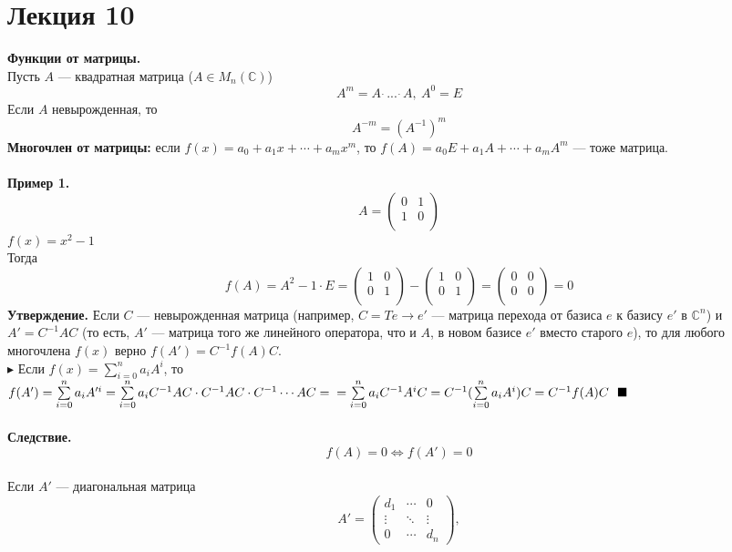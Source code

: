 \documentclass[12pt]{article}
\theoremstyle{definition}
\numberwithin{equation}{section}
\begin{document}
	\section *{Лекция 10}
	\noindent\textbf{Функции от матрицы.}\\
	Пусть $A$ --- квадратная матрица ($A\in M_n(\mathbb{C})$)
	$$A^m=A~ \dot~ ... ~\dot~ A,~A^0=E$$
	Если $A$ невырожденная, то $$A^{-m}=(A^{-1})^m$$
	\textbf{Многочлен от матрицы:} если 
	$f(x)=a_0+a_1x+\cdots+a_mx^m$, то
	$f(A)=a_0E+a_1A+\cdots +a_mA^m$ --- тоже матрица.\\
	\\
	\textbf{Пример 1.}\\
	\[A = \begin{pmatrix}
	0 & 1\\
	1 & 0\\
	\end{pmatrix}\]
	$f(x)=x^2-1$\\
	Тогда 
	\[f(A)=A^2-1\cdot E = \begin{pmatrix}
	1 & 0\\
	0 & 1\\
	\end{pmatrix} - \begin{pmatrix}
	1 & 0\\
	0 & 1\\
	\end{pmatrix} = \begin{pmatrix}
	0 & 0\\
	0 & 0\\
	\end{pmatrix} =0\]
	\textbf{Утверждение.} Если $C$ --- невырожденная матрица (например, $C=Te \to e'$ --- матрица перехода от базиса $e$ к базису $e'$ в $\mathbb{C}^n$) и $A'=C^{-1}AC$ (то есть, $A'$ --- матрица того же линейного оператора, что и $A$, в новом базисе $e'$ вместо старого $e$), то для любого многочлена $f(x)$ верно $f(A')=C^{-1}f(A)C$.\\
	$\blacktriangleright$ Если $f(x)=\sum\limits_{i=0}^n a_iA^i$, то $f(A')=\sum\limits_{i=0}^n a_i A'^i=\sum\limits_{i=0}^n a_iC^{-1}AC\cdot C^{-1}AC\cdot C^{-1}\cdots AC=\\=\sum\limits_{i=0}^n a_i C^{-1}A^iC=C^{-1}(\sum\limits_{i=0}^na_iA^i)C=C^{-1}f(A)C~~\blacksquare$\\
	\\
	\textbf{Следствие.} $$f(A)=0 \Leftrightarrow f(A')=0$$
	\\
	Если $A'$ --- диагональная матрица\[A'=\begin{pmatrix}
	d_1 & \cdots & 0\\
	\vdots & \ddots & \vdots\\
	0 & \cdots & d_n
	\end{pmatrix},\]
\end{document}
